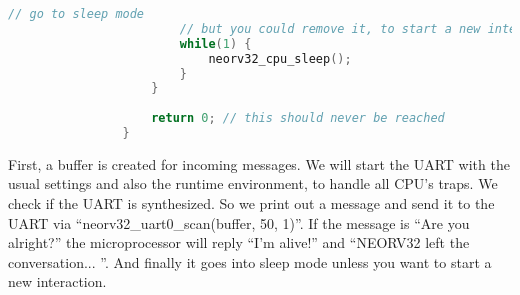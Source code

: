 \begin{lstlisting}[style=mystyle_c, language=c, breaklines]
                        // go to sleep mode
                        // but you could remove it, to start a new interaction
                        while(1) {
                            neorv32_cpu_sleep();
                        }
                    }
                
                    return 0; // this should never be reached
                }
        \end{lstlisting}

        First, a buffer is created for incoming messages. We will start the UART with the usual settings and also the runtime environment, to handle all CPU's traps. We check if the UART is synthesized. So we print out a message and send it to the UART via ``neorv32\_uart0\_scan(buffer, 50, 1)''. If the message is ``Are you alright?'' the microprocessor will reply ``I'm alive!'' and ``NEORV32 left the conversation... ''.
        And finally it goes into sleep mode unless you want to start a new interaction.
        
    

